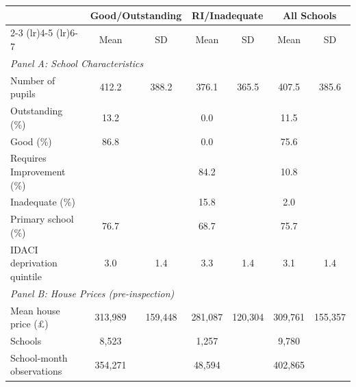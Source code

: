 \begin{tabular}{lcccccc}
\toprule
 & \multicolumn{2}{c}{Good/Outstanding} & \multicolumn{2}{c}{RI/Inadequate} & \multicolumn{2}{c}{All Schools} \\
\cmidrule(lr){2-3} \cmidrule(lr){4-5} \cmidrule(lr){6-7}
 & Mean & SD & Mean & SD & Mean & SD \\
\midrule
\multicolumn{7}{l}{\textit{Panel A: School Characteristics}} \\[3pt]
Number of pupils & 412.2 & 388.2 & 376.1 & 365.5 & 407.5 & 385.6 \\
Outstanding (\%) & 13.2 & & 0.0 & & 11.5 & \\
Good (\%) & 86.8 & & 0.0 & & 75.6 & \\
Requires Improvement (\%) & & & 84.2 & & 10.8 & \\
Inadequate (\%) & & & 15.8 & & 2.0 & \\
Primary school (\%) & 76.7 & & 68.7 & & 75.7 & \\
IDACI deprivation quintile & 3.0 & 1.4 & 3.3 & 1.4 & 3.1 & 1.4 \\
\midrule
\multicolumn{7}{l}{\textit{Panel B: House Prices (pre-inspection)}} \\[3pt]
Mean house price (\pounds) & 313,989 & 159,448 & 281,087 & 120,304 & 309,761 & 155,357 \\
\midrule
Schools & 8,523 & & 1,257 & & 9,780 & \\
School-month observations & 354,271 & & 48,594 & & 402,865 & \\
\bottomrule
\end{tabular}
